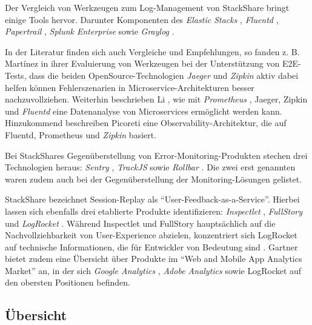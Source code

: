 Der Vergleich von Werkzeugen zum Log-Management von StackShare \cite{StackShareLogManagement} bringt einige Tools hervor. Darunter Komponenten des \textit{Elastic Stacks} \cite{ElasticStack}, \textit{Fluentd} \cite{Fluentd}, \textit{Papertrail} \cite{Papertrail}, \textit{Splunk Enterprise} \cite{SplunkEnterprise} sowie \textit{Graylog} \cite{Graylog}.

In der Literatur finden sich auch Vergleiche und Empfehlungen, so fanden z. B. Mart{\'i}nez \etal \cite{ComparisonOfE2ETestingToolsForMicroservices} in ihrer Evaluierung von Werkzeugen bei der Unterstützung von E2E-Tests, dass die beiden OpenSource-Technologien \textit{Jaeger} \cite{Jaeger} und \textit{Zipkin} \cite{Zipkin} aktiv dabei helfen können Fehlerszenarien in Microservice-Architekturen besser nachzuvollziehen. Weiterhin beschrieben Li \etal \cite{ServiceMeshChallengesStateOfTheArt}, wie mit \textit{Prometheus} \cite{Prometheus}, Jaeger, Zipkin und \textit{Fluentd} \cite{Fluentd} eine Datenanalyse von Microservices ermöglicht werden kann. Hinzukommend beschreiben Picoreti \etal \cite{MultilevelObservabilityInCloudOrchestration} eine Observability-Architektur, die auf Fluentd, Prometheus und \textit{Zipkin} basiert.

Bei StackShares Gegenüberstellung von Error-Monitoring-Produkten \cite{StackShareExceptionMonitoring} stechen drei Technologien heraus: \textit{Sentry} \cite{Sentry}, \textit{TrackJS} \cite{TrackJS} sowie \textit{Rollbar} \cite{Rollbar}. Die zwei erst genannten waren zudem auch bei der Gegenüberstellung der Monitoring-Lösungen \cite{StackShareMonitoring} gelistet.

StackShare bezeichnet Session-Replay als \enquote{User-Feedback-as-a-Service}. Hierbei \cite{StackShareUserFeedbackAsAService} lassen sich ebenfalls drei etablierte Produkte identifizieren: \textit{Inspectlet} \cite{Inspectlet}, \textit{FullStory} \cite{FullStory} und \textit{LogRocket} \cite{LogRocket}. Während Inspectlet und FullStory hauptsächlich auf die Nachvollziehbarkeit von User-Experience abzielen, konzentriert sich LogRocket auf technische Informationen, die für Entwickler von Bedeutung sind \cite{Webalyt}. Gartner bietet zudem eine Übersicht \cite{GartnerWebAndMobileAppAnalytics} über Produkte im \enquote{Web and Mobile App Analytics Market} an, in der sich \textit{Google Analytics} \cite{GoogleAnalytics}, \textit{Adobe Analytics} \cite{AdobeAnalytics} sowie LogRocket auf den obersten Positionen befinden.

\subsection{Übersicht}

